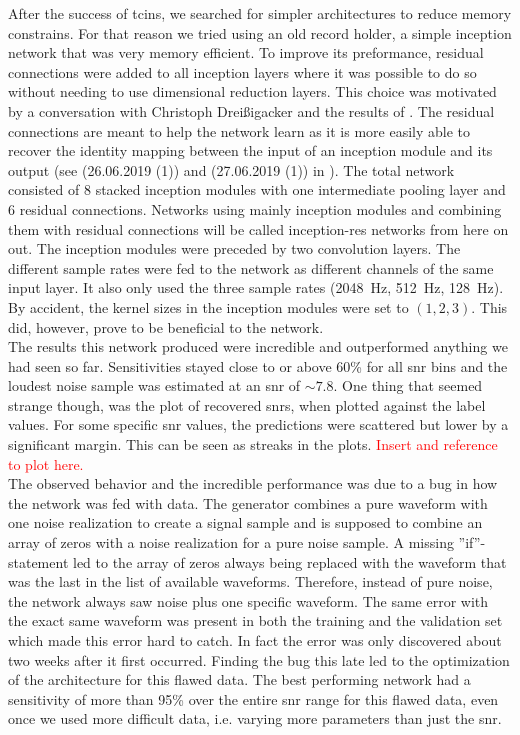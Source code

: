 After the success of \gls{tcin}s, we searched for simpler architectures to reduce memory constrains. For that reason we tried using an old record holder, a simple inception network that was very memory efficient. To improve its preformance, residual connections were added to all inception layers where it was possible to do so without needing to use dimensional reduction layers. This choice was motivated by a conversation with Christoph Dreißigacker and the results of \cite{residual_connections_invention}. The residual connections are meant to help the network learn as it is more easily able to recover the identity mapping between the input of an inception module and its output (see (26.06.2019 (1)) and (27.06.2019 (1)) in \cite{network_wiki}). The total network consisted of 8 stacked inception modules with one intermediate pooling layer and 6 residual connections. Networks using mainly inception modules and combining them with residual connections will be called inception-res networks from here on out. The inception modules were preceded by two convolution layers. The different sample rates were fed to the network as different channels of the same input layer. It also only used the three sample rates (\SI{2048}{\hertz}, \SI{512}{\hertz}, \SI{128}{\hertz}). By accident, the kernel sizes in the inception modules were set to $(1,2,3)$. This did, however, prove to be beneficial to the network.\\
The results this network produced were incredible and outperformed anything we had seen so far. Sensitivities stayed close to or above 60\% for all \gls{snr} bins and the loudest noise sample was estimated at an \gls{snr} of $\sim 7.8$. One thing that seemed strange though, was the plot of recovered \gls{snr}s, when plotted against the label values. For some specific \gls{snr} values, the predictions were scattered but lower by a significant margin. This can be seen as streaks in the plots. \textcolor{red}{Insert and reference to plot here.}\smallskip\\
The observed behavior and the incredible performance was due to a bug in how the network was fed with data. The generator combines a pure waveform with one noise realization to create a signal sample and is supposed to combine an array of zeros with a noise realization for a pure noise sample. A missing ''if''-statement led to the array of zeros always being replaced with the waveform that was the last in the list of available waveforms. Therefore, instead of pure noise, the network always saw noise plus one specific waveform. The same error with the exact same waveform was present in both the training and the validation set which made this error hard to catch. In fact the error was only discovered about two weeks after it first occurred. Finding the bug this late led to the optimization of the architecture for this flawed data. The best performing network had a sensitivity of more than 95\% over the entire \gls{snr} range for this flawed data, even once we used more difficult data, i.e. varying more parameters than just the \gls{snr}.\\
